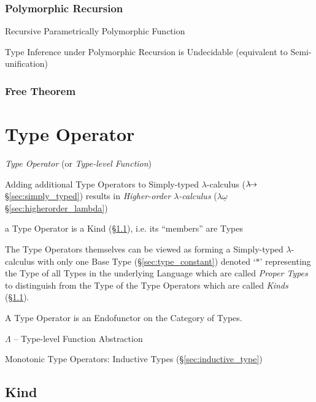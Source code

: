 \subsubsection{Polymorphic Recursion}\label{sec:polymorphic_recursion}

Recursive Parametrically Polymorphic Function

Type Inference under Polymorphic Recursion is Undecidable (equivalent
to Semi-unification) %



\subsubsection{Free Theorem}\label{sec:free_theorem}



\section{Type Operator}\label{sec:type_operator}

\emph{Type Operator} (or \emph{Type-level Function})

Adding additional Type Operators to Simply-typed $\lambda$-calculus
($\lambda\kern-5pt\rightarrow$ \S\ref{sec:simply_typed}) results in
\emph{Higher-order $\lambda$-calculus} ($\lambda\underline{\omega}$
\S\ref{sec:higherorder_lambda})

a Type Operator is a Kind (\S\ref{sec:kind}), i.e. its ``members'' are
Types

The Type Operators themselves can be viewed as forming a Simply-typed
$\lambda$-calculus with only one Base Type (\S\ref{sec:type_constant})
denoted `$\ast$' representing the Type of all Types in the underlying
Language which are called \emph{Proper Types} to distinguish from the
Type of the Type Operators which are called \emph{Kinds}
(\S\ref{sec:kind}).

A Type Operator is an Endofunctor on the Category of Types.

$\Lambda$ -- Type-level Function Abstraction

Monotonic Type Operators: Inductive Types (\S\ref{sec:inductive_type})



\subsection{Kind}\label{sec:kind}


